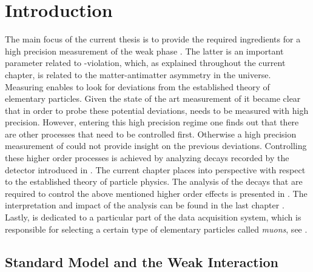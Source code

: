 
\chapter{Introduction}
\label{Introduction}

The main focus of the current thesis is to provide the required ingredients for a high precision measurement of
the weak phase \phis. The latter is an important parameter related to \CP-violation, which, as explained throughout
the current chapter, is related to the matter-antimatter asymmetry in the universe. Measuring \phis enables to look
for deviations from the established theory of elementary particles. Given the state of the art measurement of \phis \cite{phis-3fb-paper} 
it became clear that in order to probe these potential deviations, \phis needs to be measured with high precision.
However, entering this high precision regime one finds out that there are other processes that need to be 
controlled first. Otherwise a high precision measurement of \phis could not provide insight on the previous 
deviations. Controlling these higher order processes is achieved by analyzing \BsJpsiKst decays recorded
by the \lhcb detector introduced in . The current chapter places \phis into perspective 
with respect to the established theory of particle physics. The analysis of the \BsJpsiKst decays that are 
required to control the above mentioned higher order effects is presented in . 
The interpretation and impact of the analysis can be found in the last chapter .
Lastly,  is dedicated to a particular part of the \lhcb data acquisition system, 
which is responsible for selecting a certain type of elementary particles called {\it muons}, see .


\section{Standard Model and the Weak Interaction}
\label{The_Standard_Model}


